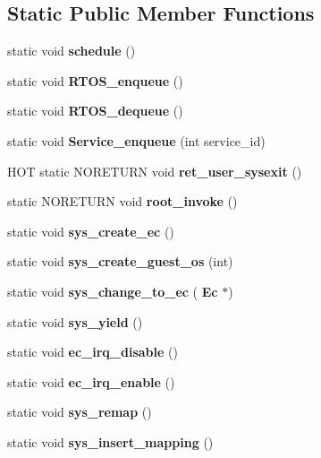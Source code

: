 \subsection*{Static Public Member Functions}
\begin{DoxyCompactItemize}
\item 
\mbox{\label{class_ec_a63ce2ecf7f02885bb61ba6adf552e30a}} 
static void {\bfseries schedule} ()
\item 
\mbox{\label{class_ec_ae84e5c4b41d590442cda695f5e2d236f}} 
static void {\bfseries R\+T\+O\+S\+\_\+enqueue} ()
\item 
\mbox{\label{class_ec_a4b76425b9e0f12c748d0dacab80ef0c2}} 
static void {\bfseries R\+T\+O\+S\+\_\+dequeue} ()
\item 
\mbox{\label{class_ec_ab0ffaa3b03e0308a8f55f501c1721eae}} 
static void {\bfseries Service\+\_\+enqueue} (int service\+\_\+id)
\item 
\mbox{\label{class_ec_a8a9ebcb5fdbf4a5328a045063cdb419c}} 
H\+OT static N\+O\+R\+E\+T\+U\+RN void {\bfseries ret\+\_\+user\+\_\+sysexit} ()
\item 
\mbox{\label{class_ec_abd356433658c5cc7fd88d998381c140c}} 
static N\+O\+R\+E\+T\+U\+RN void {\bfseries root\+\_\+invoke} ()
\item 
\mbox{\label{class_ec_a04d96215bda7499ee35553eb9d0e81e4}} 
static void {\bfseries sys\+\_\+create\+\_\+ec} ()
\item 
\mbox{\label{class_ec_ac988898d6639a25a3afd134e557d490b}} 
static void {\bfseries sys\+\_\+create\+\_\+guest\+\_\+os} (int)
\item 
\mbox{\label{class_ec_ac0c3698f6b9d69783a78bb867160641e}} 
static void {\bfseries sys\+\_\+change\+\_\+to\+\_\+ec} (\textbf{ Ec} $\ast$)
\item 
\mbox{\label{class_ec_aaf5cc8f2ed992f3053b8f27fc6d1ffee}} 
static void {\bfseries sys\+\_\+yield} ()
\item 
\mbox{\label{class_ec_a3c7a54b5fee4015dddc522d6e9c236ab}} 
static void {\bfseries ec\+\_\+irq\+\_\+disable} ()
\item 
\mbox{\label{class_ec_a32ea3162594ebf83549e0803c23f80eb}} 
static void {\bfseries ec\+\_\+irq\+\_\+enable} ()
\item 
\mbox{\label{class_ec_aa8bc4d1b7706c1ae4dfa71699fbf5103}} 
static void {\bfseries sys\+\_\+remap} ()
\item 
\mbox{\label{class_ec_a0fd01d6764fa4b7cc087a0062b6a33b0}} 
static void {\bfseries sys\+\_\+insert\+\_\+mapping} ()
\item 
\mbox{\label{class_ec_aadeb689e70e240d0d16e67b867f21d14}} 

\end{DoxyCompactItemize}
